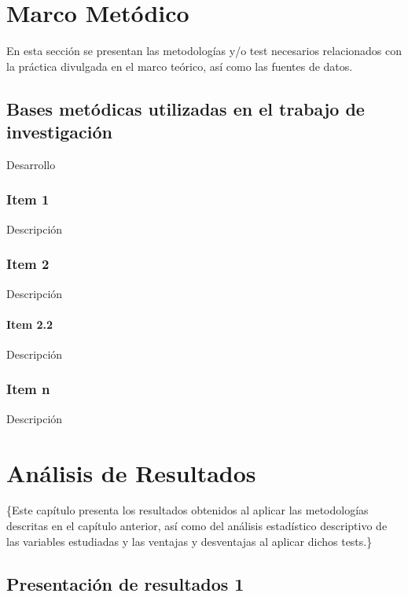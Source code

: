 \documentclass[oneside,11pt]{Latex/Classes/PhDthesisPSnPDF}
\begin{document}
\chapter{Marco Metódico}

En esta sección se presentan las metodologías y/o test necesarios
relacionados con la práctica divulgada en el marco teórico, así como las
fuentes de datos.

\section{Bases metódicas utilizadas en el trabajo de investigación}

Desarrollo\\

\subsection{Item 1}

Descripción\\

\subsection{Item 2}

Descripción\\

\subsubsection{Item 2.2}

Descripción\\

\subsection{Item n}

Descripción\\

\chapter{Análisis de Resultados}

\{\small Este capítulo presenta los resultados obtenidos al aplicar las
metodologías descritas en el capítulo anterior, así como del análisis
estadístico descriptivo de las variables estudiadas y las ventajas y
desventajas al aplicar dichos tests.\}

\section{Presentación de resultados 1}
\end{document}

